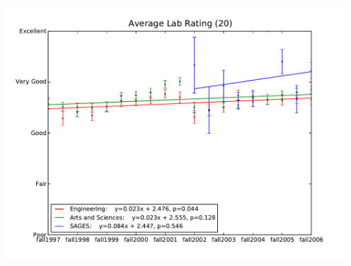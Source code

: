 \documentclass[12pt]{article}
\begin{document}
\begin{center}
    \includegraphics[width=5in]{figures/20_lab_over_time.pdf}
\end{center}
\end{document}
